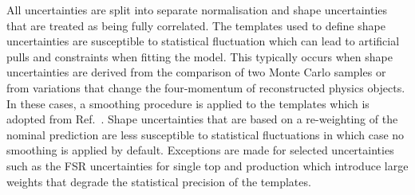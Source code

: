 All uncertainties are split into separate normalisation and shape uncertainties
that are treated as being fully correlated. The templates used to define shape
uncertainties are susceptible to statistical fluctuation which can lead to
artificial pulls and constraints when fitting the model. This typically occurs
when shape uncertainties are derived from the comparison of two Monte Carlo
samples or from variations that change the four-momentum of reconstructed
physics objects. In these cases, a smoothing procedure is applied to the
templates which is adopted from Ref.~\cite{HIGG-2013-23}. Shape uncertainties
that are based on a re-weighting of the nominal prediction are less susceptible
to statistical fluctuations in which case no smoothing is applied by
default. Exceptions are made for selected uncertainties such as the FSR
uncertainties for single top and \ttbar production which introduce large weights
that degrade the statistical precision of the templates.



